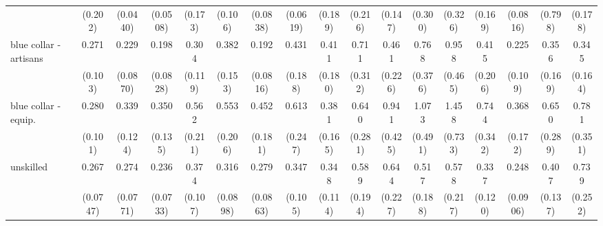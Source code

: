 {\begin{tabular}{l*{16}{c}}
                    &     (0.202)         &    (0.0440)         &    (0.0508)         &     (0.173)         &     (0.106)         &    (0.0838)         &    (0.0619)         &     (0.189)         &     (0.216)         &     (0.147)         &     (0.300)         &     (0.326)         &     (0.169)         &    (0.0816)         &     (0.798)         &     (0.178)         \\
[1em]
blue collar - artisans&       0.271\sym{***}&       0.229\sym{***}&       0.198\sym{***}&       0.304\sym{**} &       0.382\sym{*}  &       0.192\sym{***}&       0.431         &       0.411\sym{*}  &       0.711         &       0.461         &       0.768         &       0.958         &       0.415         &       0.225\sym{**} &       0.356\sym{*}  &       0.345\sym{*}  \\
                    &     (0.103)         &    (0.0870)         &    (0.0828)         &     (0.119)         &     (0.153)         &    (0.0816)         &     (0.188)         &     (0.180)         &     (0.312)         &     (0.226)         &     (0.376)         &     (0.465)         &     (0.206)         &     (0.109)         &     (0.169)         &     (0.164)         \\
[1em]
blue collar - equip.&       0.280\sym{***}&       0.339\sym{**} &       0.350\sym{**} &       0.562         &       0.553         &       0.452\sym{*}  &       0.613         &       0.381\sym{*}  &       0.640         &       0.941         &       1.073         &       1.458         &       0.744         &       0.368\sym{*}  &       0.650         &       0.781         \\
                    &     (0.101)         &     (0.124)         &     (0.135)         &     (0.211)         &     (0.206)         &     (0.181)         &     (0.247)         &     (0.165)         &     (0.281)         &     (0.425)         &     (0.491)         &     (0.733)         &     (0.342)         &     (0.172)         &     (0.289)         &     (0.351)         \\
[1em]
unskilled           &       0.267\sym{***}&       0.274\sym{***}&       0.236\sym{***}&       0.374\sym{***}&       0.316\sym{***}&       0.279\sym{***}&       0.347\sym{***}&       0.348\sym{**} &       0.589         &       0.644         &       0.517         &       0.578         &       0.337\sym{**} &       0.248\sym{***}&       0.407\sym{**} &       0.739         \\
                    &    (0.0747)         &    (0.0771)         &    (0.0733)         &     (0.107)         &    (0.0898)         &    (0.0863)         &     (0.105)         &     (0.114)         &     (0.194)         &     (0.227)         &     (0.188)         &     (0.217)         &     (0.120)         &    (0.0906)         &     (0.137)         &     (0.252)         \\

\end{tabular}}
